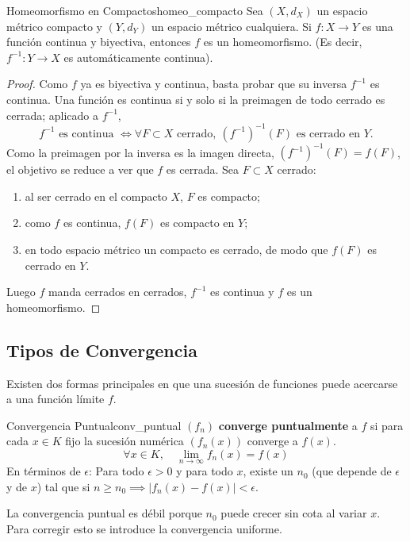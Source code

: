 \documentclass[11pt, a4paper]{article}
\begin{document}
\begin{teorema}{Homeomorfismo en Compactos}{homeo_compacto}
Sea $(X, d_X)$ un espacio métrico compacto y $(Y, d_Y)$ un espacio métrico cualquiera.
Si $f: X \to Y$ es una función continua y biyectiva, entonces $f$ es un homeomorfismo.
(Es decir, $f^{-1}: Y \to X$ es automáticamente continua).
\end{teorema}

\begin{proof}
Como $f$ ya es biyectiva y continua, basta probar que su inversa $f^{-1}$ es continua. Una función
es continua si y solo si la preimagen de todo cerrado es cerrada; aplicado a $f^{-1}$,
$$ f^{-1} \text{ es continua } \iff \forall F \subset X \text{ cerrado}, \ (f^{-1})^{-1}(F)
\text{ es cerrado en } Y. $$
Como la preimagen por la inversa es la imagen directa, $(f^{-1})^{-1}(F) = f(F)$, el objetivo se
reduce a ver que $f$ es cerrada. Sea $F \subset X$ cerrado:
\begin{enumerate}
    \item al ser cerrado en el compacto $X$, $F$ es compacto;
    \item como $f$ es continua, $f(F)$ es compacto en $Y$;
    \item en todo espacio métrico un compacto es cerrado, de modo que $f(F)$ es cerrado en $Y$.
\end{enumerate}
Luego $f$ manda cerrados en cerrados, $f^{-1}$ es continua y $f$ es un homeomorfismo.
\end{proof}

\subsection{Tipos de Convergencia}

Existen dos formas principales en que una sucesión de funciones puede acercarse a una función límite
$f$.

\begin{definicion}{Convergencia Puntual}{conv_puntual}
$(f_n)$ \textbf{converge puntualmente} a $f$ si para cada $x \in K$ fijo la sucesión numérica
$(f_n(x))$ converge a $f(x)$.
$$ \forall x \in K, \quad \lim_{n \to \infty} f_n(x) = f(x) $$
En términos de $\epsilon$: Para todo $\epsilon > 0$ y para todo $x$, existe un $n_0$ (que depende de
$\epsilon$ y de $x$) tal que si $n \ge n_0 \implies |f_n(x) - f(x)| < \epsilon$.
\end{definicion}

La convergencia puntual es débil porque $n_0$ puede crecer sin cota al variar $x$. Para corregir
esto se introduce la convergencia uniforme.
\end{document}
